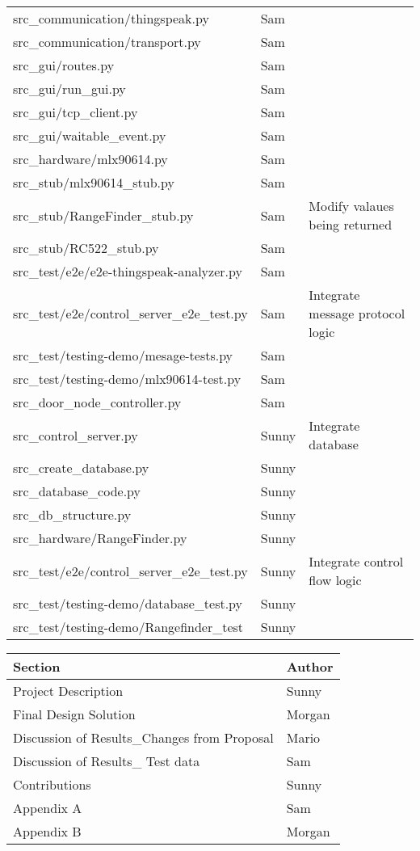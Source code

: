 \begin{center}
\begin{tabular}{lll}
src\_communication/thingspeak.py & Sam&\\
src\_communication/transport.py & Sam&\\
src\_gui/routes.py & Sam&\\
src\_gui/run\_gui.py & Sam&\\
src\_gui/tcp\_client.py & Sam&\\
src\_gui/waitable\_event.py & Sam&\\
src\_hardware/mlx90614.py & Sam&\\
src\_stub/mlx90614\_stub.py & Sam&\\
src\_stub/RangeFinder\_stub.py & Sam & Modify valaues being returned\\
src\_stub/RC522\_stub.py & Sam&\\
src\_test/e2e/e2e-thingspeak-analyzer.py & Sam&\\
src\_test/e2e/control\_server\_e2e\_test.py & Sam& Integrate message protocol logic\\
src\_test/testing-demo/mesage-tests.py & Sam&\\
src\_test/testing-demo/mlx90614-test.py & Sam&\\
src\_door\_node\_controller.py & Sam&\\
src\_control\_server.py & Sunny & Integrate database \\
src\_create\_database.py & Sunny&\\
src\_database\_code.py & Sunny&\\
src\_db\_structure.py & Sunny&\\
src\_hardware/RangeFinder.py & Sunny&\\
src\_test/e2e/control\_server\_e2e\_test.py & Sunny& Integrate control flow logic\\
src\_test/testing-demo/database\_test.py & Sunny&\\
src\_test/testing-demo/Rangefinder\_test & Sunny&\\
\end{tabular}
\end{center}

\begin{center}
	\begin{tabular}{ll}
		Section & Author\\
		\hline
		Project Description &  Sunny\\
		Final Design Solution &   Morgan\\
		Discussion of Results\_Changes from Proposal &   Mario\\
		Discussion of Results\_ Test data &   Sam\\
		Contributions &   Sunny\\
		Appendix A &   Sam\\
		Appendix B &   Morgan\\
	\end{tabular}
\end{center}
